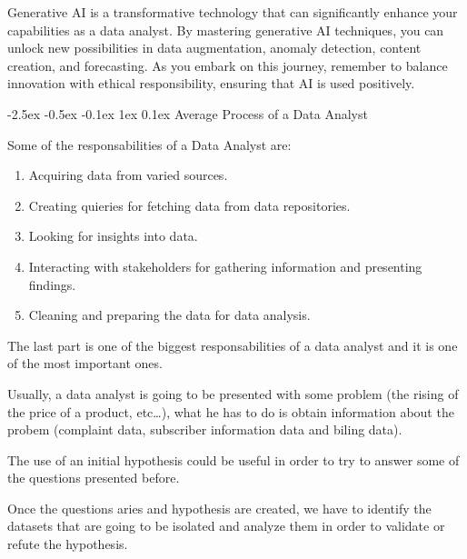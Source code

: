 \documentclass[12pt]{report}
\makeatletter
\renewcommand{\section}{\@startsection{section}{1}{\z@}%
  {-2.5ex \@plus -0.5ex \@minus -0.1ex}%
  {1ex \@plus 0.1ex}%
  {\normalfont\Large\sectionstyle}}
\newcommand{\sectionstyle}[1]{%
  \par\noindent\hrule
  \vspace{0.2ex}%
  {\scshape{#1}\par}%
  \vspace{0.4ex}%
  \hrule
}
\theoremstyle{largebreak}
\makeatother
\begin{document}
    Generative AI is a transformative technology that can significantly enhance your capabilities as a data analyst. By mastering generative AI techniques, you can unlock new possibilities in data augmentation, anomaly detection, content creation, and forecasting. As you embark on this journey, remember to balance innovation with ethical responsibility, ensuring that AI is used positively.

    \section{Average Process of a Data Analyst}
    
    Some of the responsabilities of a Data Analyst are:
    \begin{enumerate}[label =\textit{(\arabic*)}]
        \item Acquiring data from varied sources.
        \item Creating quieries for fetching data from data repositories.
        \item Looking for insights into data.
        \item Interacting with stakeholders for gathering information and presenting findings.
        \item Cleaning and preparing the data for data analysis.
    \end{enumerate}

    The last part is one of the biggest responsabilities of a data analyst and it is one of the most important ones.

    Usually, a data analyst is going to be presented with some problem (the rising of the price of a product, etc\dots), what he has to do is obtain information about the probem (complaint data, subscriber information data and biling data).

    \begin{obs}
        The use of an initial hypothesis could be useful in order to try to answer some of the questions presented before.
    \end{obs}

    Once the questions aries and hypothesis are created, we have to identify the datasets that are going to be isolated and analyze them in order to validate or refute the hypothesis.
\end{document}
